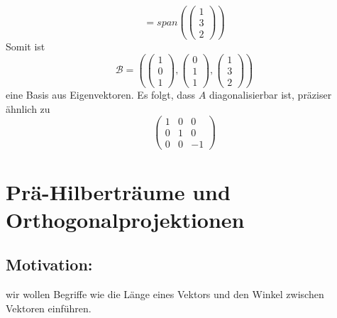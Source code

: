 \documentclass{scrbook}
\begin{document}
\[=span
\left(
\left(
\begin{array}{c}
1\\3\\2
\end{array}
\right)
\right)
\]
Somit ist
\[\mathscr{B}=\left(
\left(
\begin{array}{c}
1\\0\\1
\end{array}
\right),\left(
\begin{array}{c}
0\\1\\1
\end{array}
\right),\left(
\begin{array}{c}
1\\3\\2
\end{array}
\right)\right)\]
eine Basis aus Eigenvektoren. Es folgt, dass $A$ diagonalisierbar ist, präziser ähnlich zu
\[
\left(
\begin{array}{ccc}
1&0&0\\
0&1&0\\
0&0&-1
\end{array}
\right)
\]
\chapter{Prä-Hilberträume und Orthogonalprojektionen}
\section*{Motivation:}
wir wollen Begriffe wie die Länge eines Vektors und den Winkel zwischen Vektoren einführen.
\end{document}
